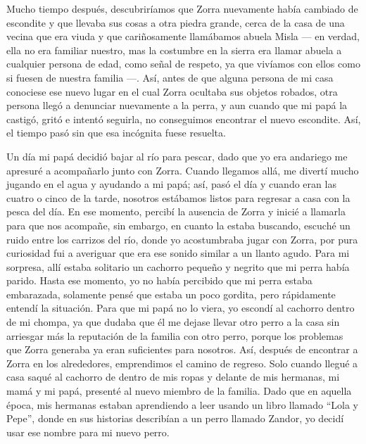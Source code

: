 Mucho tiempo después, descubriríamos que Zorra nuevamente había cambiado de escondite y que llevaba sus cosas a otra piedra grande, cerca de la casa de una vecina que era viuda y que cariñosamente llamábamos abuela Misla --- en verdad, ella no era familiar nuestro, mas la costumbre en la sierra era llamar abuela a cualquier persona de edad, como señal de respeto, ya que vivíamos con ellos como si fuesen de nuestra familia ---.
Así, antes de que alguna persona de mi casa conociese ese nuevo lugar en el cual Zorra ocultaba sus objetos robados, otra persona llegó a denunciar nuevamente a la perra, y aun cuando que mi papá la castigó, gritó e intentó seguirla, no conseguimos encontrar el nuevo escondite. Así, el tiempo pasó sin que esa incógnita fuese resuelta.

Un día mi papá decidió bajar al río para pescar, dado que yo era andariego me apresuré a acompañarlo junto con Zorra. 
Cuando llegamos allá, me divertí mucho jugando en el agua y ayudando a mi papá; así, pasó el día y cuando eran las cuatro o cinco de la tarde, nosotros estábamos listos para regresar a casa con la pesca del día.
En ese momento, percibí la ausencia de Zorra y inicié a llamarla para que nos acompañe, 
sin embargo, en cuanto la estaba buscando, escuché un ruido entre los carrizos del río, donde yo acostumbraba jugar con Zorra, por pura curiosidad fui a averiguar que era ese sonido similar a un llanto agudo. Para mi sorpresa, allí estaba solitario un cachorro pequeño y negrito que mi perra había parido.
Hasta ese momento, yo no había percibido que mi perra estaba embarazada, solamente pensé que estaba un poco gordita,
pero rápidamente entendí la situación.
Para que mi papá no lo viera, yo escondí al cachorro dentro de mi chompa, ya que dudaba que él me dejase llevar otro perro a la casa sin arriesgar más la reputación de la familia con otro perro, porque los problemas que Zorra generaba ya eran suficientes para nosotros.
Así, después de encontrar a Zorra en los alrededores, emprendimos el camino de regreso.
Solo cuando llegué a casa saqué al cachorro de dentro de mis ropas y delante de mis hermanas, mi mamá y mi papá, presenté al nuevo miembro de la familia. Dado que en aquella época, mis hermanas estaban aprendiendo a leer usando un libro llamado ``Lola y Pepe'', donde en sus historias describían a un perro llamado Zandor, yo decidí usar ese nombre para mi nuevo perro.

